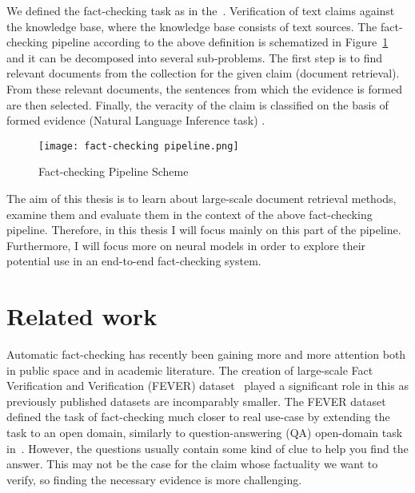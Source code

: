     We defined the fact-checking task as in the~\parencite{thorne2018fever}. Verification of text claims against the knowledge base, where the knowledge base consists of text sources. The fact-checking pipeline according to the above definition is schematized in Figure~\ref{fig:factcheck-pipeline} and it can be decomposed into several sub-problems. The first step is to find relevant documents from the collection for the given claim (document retrieval). From these relevant documents, the sentences from which the evidence is formed are then selected. Finally, the veracity of the claim is classified on the basis of formed evidence (Natural Language Inference task) . %
    \begin{figure}[ht]
        \texttt{[image: fact-checking pipeline.png]}
        \centering
        \caption{Fact-checking Pipeline Scheme}
        \label{fig:factcheck-pipeline}
    \end{figure}

    The aim of this thesis is to learn about large-scale document retrieval methods, examine them and evaluate them in the context of the above fact-checking pipeline. Therefore, in this thesis I will focus mainly on this part of the pipeline. Furthermore, I will focus more on neural models in order to explore their potential use in an end-to-end fact-checking system.

\section{Related work}
\label{section:related-work}
    Automatic fact-checking has recently been gaining more and more attention both in public space and in academic literature. The creation of large-scale Fact Verification and Verification (FEVER) dataset~\parencite{thorne2018fever} played a significant role in this as previously published datasets are incomparably smaller. The FEVER dataset defined the task of fact-checking much closer to real use-case by extending the task to an open domain, similarly to question-answering (QA) open-domain task in~\parencite{chen2017reading-drqa}. However, the questions usually contain some kind of clue to help you find the answer. This may not be the case for the claim whose factuality we want to verify, so finding the necessary evidence is more challenging.
    
